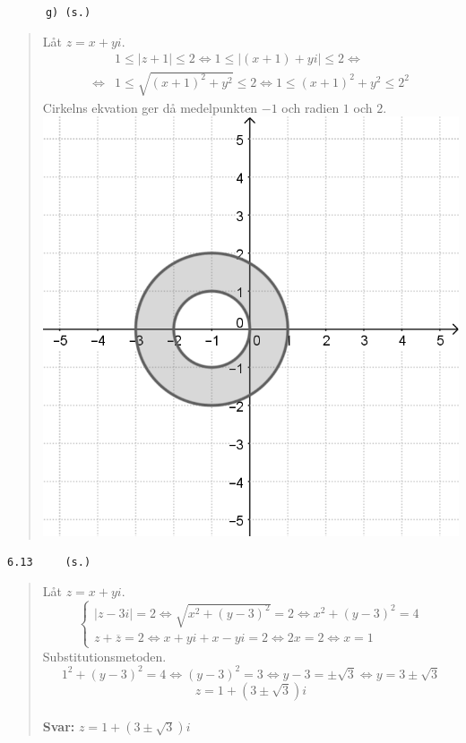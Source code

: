 \documentclass[a4paper]{article}
\newcommand{\tskcol}[1]{\textcolor{tskcol}{#1}}
\begin{document}
	\texttt{\tskcol{~~~~~~g) (s.)}}
	\begin{quotation}
		\noindent
		Låt $z=x+yi$.
		\begin{align*}
		&1 \le |z+1| \le 2 \Leftrightarrow
		1 \le |(x+1)+yi| \le 2 \Leftrightarrow \\ \Leftrightarrow
		&1 \le \sqrt{(x+1)^2+y^2} \le 2 \Leftrightarrow
		1 \le (x+1)^2+y^2 \le 2^2
		\end{align*}
		Cirkelns ekvation ger då medelpunkten $-1$ och radien $1$ och $2$. \\
		\includegraphics[scale=0.2]{images/612g.PNG}
	\end{quotation}
	
	\texttt{\tskcol{6.13~~~~ (s.)}}
	\begin{quotation}
		\noindent
		Låt $z=x+yi$.
		\[\begin{cases}
		|z-3i|=2 \Leftrightarrow
		\sqrt{x^2+(y-3)^2}=2 \Leftrightarrow
		x^2+(y-3)^2=4\\
		z+\overline{z}=2 \Leftrightarrow
		x+yi+x-yi=2 \Leftrightarrow
		2x=2 \Leftrightarrow
		x=1
		\end{cases}\]
		Substitutionsmetoden.
		\[1^2+(y-3)^2=4 \Leftrightarrow
		(y-3)^2=3 \Leftrightarrow
		y-3=\pm\sqrt{3} \Leftrightarrow
		y=3\pm\sqrt{3}\]
		\[z=1+(3\pm\sqrt{3})i\]
		\\
		\textbf{Svar:} $z=1+(3\pm\sqrt{3})i$
	\end{quotation}
	
\end{document}

